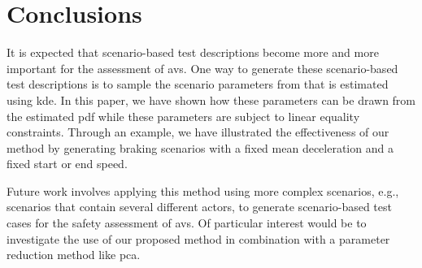 \section{Conclusions}
\label{sec:conclusions}

It is expected that scenario-based test descriptions become more and more important for the assessment of \acp{av}. 
One way to generate these scenario-based test descriptions is to sample the scenario parameters from  that is estimated using \ac{kde}. 
In this paper, we have shown how these parameters can be drawn from the estimated \ac{pdf} while these parameters are subject to linear equality constraints. 
Through an example, we have illustrated the effectiveness of our method by generating braking scenarios with a fixed mean deceleration and a fixed start or end speed. 

Future work involves applying this method using more complex scenarios, e.g., scenarios that contain several different actors, to generate scenario-based test cases for the safety assessment of \acp{av}.
Of particular interest would be to investigate the use of our proposed method in combination with a parameter reduction method like \ac{pca}. 
